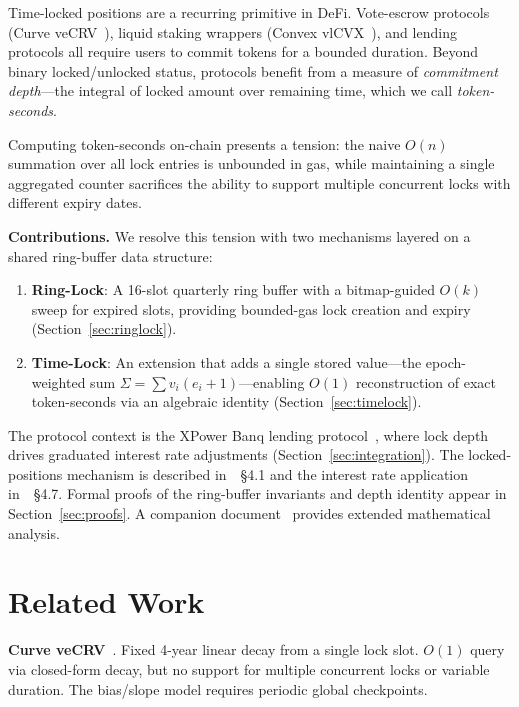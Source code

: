 \documentclass[10pt,a4paper,twocolumn]{article}
\begin{document}
Time-locked positions are a recurring primitive in DeFi. Vote-escrow protocols (Curve veCRV~\cite{curve}), liquid staking wrappers (Convex vlCVX~\cite{convex}), and lending protocols all require users to commit tokens for a bounded duration. Beyond binary locked/unlocked status, protocols benefit from a measure of \emph{commitment depth}---the integral of locked amount over remaining time, which we call \emph{token-seconds}.

Computing token-seconds on-chain presents a tension: the naive $O(n)$ summation over all lock entries is unbounded in gas, while maintaining a single aggregated counter sacrifices the ability to support multiple concurrent locks with different expiry dates.

\textbf{Contributions.} We resolve this tension with two mechanisms layered on a shared ring-buffer data structure:

\begin{enumerate}[leftmargin=*]
\item \textbf{Ring-Lock}: A 16-slot quarterly ring buffer with a bitmap-guided $O(k)$ sweep for expired slots, providing bounded-gas lock creation and expiry (Section~\ref{sec:ringlock}).

\item \textbf{Time-Lock}: An extension that adds a single stored value---the epoch-weighted sum $\Sigma = \sum v_i(e_i{+}1)$---enabling $O(1)$ reconstruction of exact token-seconds via an algebraic identity (Section~\ref{sec:timelock}).
\end{enumerate}

The protocol context is the XPower Banq lending protocol~\cite{wp}, where lock depth drives graduated interest rate adjustments (Section~\ref{sec:integration}). The locked-positions mechanism is described in~\cite{wp}~\S4.1 and the interest rate application in~\cite{wp}~\S4.7. Formal proofs of the ring-buffer invariants and depth identity appear in Section~\ref{sec:proofs}. A companion document~\cite{mtp,sim,ref} provides extended mathematical analysis.

\section{Related Work}
\label{sec:related}

\textbf{Curve veCRV}~\cite{curve}. Fixed 4-year linear decay from a single lock slot. $O(1)$ query via closed-form decay, but no support for multiple concurrent locks or variable duration. The bias/slope model requires periodic global checkpoints.
\end{document}
